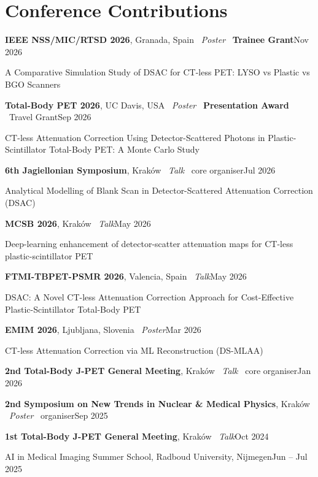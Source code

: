 \documentclass[10.5pt,a4paper]{article}
\newcommand{\row}[2]{\noindent #1\hfill{\small\color{mute}#2}\par\vspace{2.5pt}}
\newcommand{\sub}[1]{\vspace{3pt}{\sffamily\small\bfseries\color{mute}\MakeUppercase{#1}}\par\vspace{2pt}}
\begin{document}
\section{Conference Contributions}
\row{\textbf{IEEE NSS/MIC/RTSD 2026}, Granada, Spain \textendash\ \emph{Poster} \textbullet\ \textbf{Trainee Grant}}{Nov 2026}
{\small\color{mute}\hspace{1.1em}A Comparative Simulation Study of DSAC for CT-less PET: LYSO vs Plastic vs BGO Scanners}\par\vspace{3pt}
\row{\textbf{Total-Body PET 2026}, UC Davis, USA \textendash\ \emph{Poster} \textbullet\ \textbf{Presentation Award} \textbullet\ Travel Grant}{Sep 2026}
{\small\color{mute}\hspace{1.1em}CT-less Attenuation Correction Using Detector-Scattered Photons in Plastic-Scintillator Total-Body PET: A Monte Carlo Study}\par\vspace{3pt}
\row{\textbf{6th Jagiellonian Symposium}, Kraków \textendash\ \emph{Talk} \textbullet\ core organiser}{Jul 2026}
{\small\color{mute}\hspace{1.1em}Analytical Modelling of Blank Scan in Detector-Scattered Attenuation Correction (DSAC)}\par\vspace{3pt}
\row{\textbf{MCSB 2026}, Kraków \textendash\ \emph{Talk}}{May 2026}
{\small\color{mute}\hspace{1.1em}Deep-learning enhancement of detector-scatter attenuation maps for CT-less plastic-scintillator PET}\par\vspace{3pt}
\row{\textbf{FTMI-TBPET-PSMR 2026}, Valencia, Spain \textendash\ \emph{Talk}}{May 2026}
{\small\color{mute}\hspace{1.1em}DSAC: A Novel CT-less Attenuation Correction Approach for Cost-Effective Plastic-Scintillator Total-Body PET}\par\vspace{3pt}
\row{\textbf{EMIM 2026}, Ljubljana, Slovenia \textendash\ \emph{Poster}}{Mar 2026}
{\small\color{mute}\hspace{1.1em}CT-less Attenuation Correction via ML Reconstruction (DS-MLAA)}\par\vspace{3pt}
\row{\textbf{2nd Total-Body J-PET General Meeting}, Kraków \textendash\ \emph{Talk} \textbullet\ core organiser}{Jan 2026}
\row{\textbf{2nd Symposium on New Trends in Nuclear \& Medical Physics}, Kraków \textendash\ \emph{Poster} \textbullet\ organiser}{Sep 2025}
\row{\textbf{1st Total-Body J-PET General Meeting}, Kraków \textendash\ \emph{Talk}}{Oct 2024}
\sub{Schools}
\row{AI in Medical Imaging Summer School, Radboud University, Nijmegen}{Jun -- Jul 2025}
\end{document}
